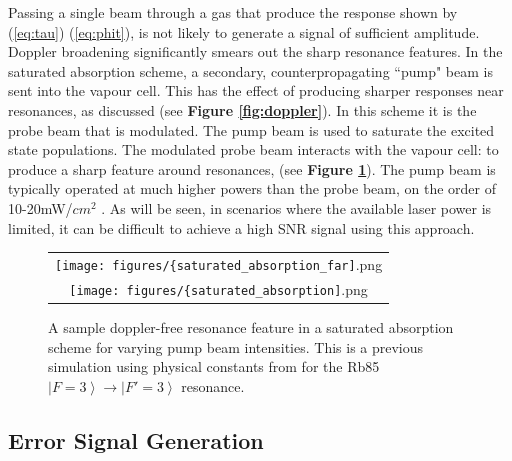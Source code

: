 Passing a single beam through a gas that produce the response shown by (\ref{eq:tau}) (\ref{eq:phit}), is not likely to generate a signal of sufficient amplitude. Doppler broadening significantly smears out the sharp resonance features. In the saturated absorption scheme, a secondary, counterpropagating ``pump" beam is sent into the vapour cell. This has the effect of producing sharper responses near resonances, as discussed (see \textbf{Figure \ref{fig:doppler}}). In this scheme it is the probe beam that is modulated. The pump beam is used to saturate the excited state populations. The modulated probe beam interacts with the vapour cell:
to produce a sharp feature around resonances, (see \textbf{Figure \ref{fig:sat_abs}}). The pump beam is typically operated at much higher powers than the probe beam, on the order of 10-20mW/$cm^2$ \cite{maguire2006}. As will be seen, in scenarios where the available laser power is limited, it can be difficult to achieve a high SNR signal using this approach.

\begin{figure}
  \centering
  \begin{tabular}{c}
    \texttt{[image: figures/\{saturated\_absorption\_far]}.png}\\
    \texttt{[image: figures/\{saturated\_absorption]}.png}
  \end{tabular}
  \caption{A sample doppler-free resonance feature in a saturated absorption scheme for varying pump beam intensities. This is a previous simulation using physical constants from \cite{steckrb85} for the Rb85 $\left|F=3\right\rangle \rightarrow \left|F'=3\right\rangle$ resonance.}
  \label{fig:sat_abs}
\end{figure}



\subsection{Error Signal Generation}

